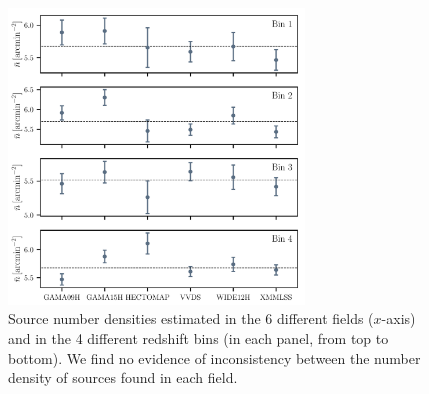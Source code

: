 \documentclass[a4paper,11pt]{article}
\begin{document}
      \begin{figure}
        \centering
        \includegraphics[width=0.7\textwidth]{figures/ndens_consistency.pdf}
        \caption{Source number densities estimated in the 6 different fields ($x$-axis) and in the 4 different redshift bins (in each panel, from top to bottom). We find no evidence of inconsistency between the number density of sources found in each field.}
        \label{fig:ndens_consistency}
      \end{figure}
\end{document}
